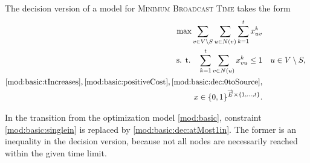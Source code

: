 The decision version of a model for \textsc{Minimum Broadcast Time} takes the form
\begin{subequations}\label{mod:basic:dec}
\begin{align}
\label{mod:basic:dec:obj} \max \sum\limits_{v \in V\setminus S}\sum\limits_{u \in N(v)} \sum\limits_{k=1}^{t}x_{uv}^k \\ 
\text{s. t.~~~} \label{mod:basic:dec:atMost1in} \sum\limits_{k=1}^{t}\sum\limits_{v\in N(u)}x_{vu}^k  \leq 1 && u\in V \setminus S,\\
\eqref{mod:basic:tIncreases},  \eqref{mod:basic:positiveCost}, \eqref{mod:basic:dec:0toSource}, \\
\label{mod:basic:dec:dim}x \in \{0,1\}^{\overrightarrow{E}\times \{1,\dots,t\}}.&&
\end{align}~
\end{subequations}

In the transition from the optimization model \eqref{mod:basic}, constraint \eqref{mod:basic:singlein} is replaced by \eqref{mod:basic:dec:atMost1in}.
The former is an inequality in the decision version, because not all nodes are necessarily reached within the given time limit.

